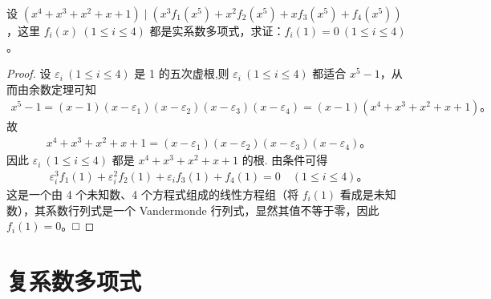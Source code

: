 \documentclass[lang=cn,newtx,10pt,scheme=chinese]{elegantbook}
\begin{document}
\begin{example}
设 $(x^4 + x^3 + x^2 + x + 1) \mid (x^3 f_1(x^5) + x^2 f_2(x^5) + x f_3(x^5) + f_4(x^5))$，这里 $f_i(x) \ (1 \leq i \leq 4)$ 都是实系数多项式，求证：$f_i(1) = 0 \ (1 \leq i \leq 4)$。
\end{example}
\begin{proof}
设 $\varepsilon_i \ (1 \leq i \leq 4)$ 是 1 的五次虚根,则 $\varepsilon_i \ (1 \leq i \leq 4)$ 都适合 $x^5 - 1$，从而由余数定理可知
\begin{align*}
x^5 - 1 = (x - 1)(x - \varepsilon_1)(x - \varepsilon_2)(x - \varepsilon_3)(x - \varepsilon_4) = (x - 1)(x^4 + x^3 + x^2 + x + 1)。
\end{align*}
故
\begin{align*}
x^4 + x^3 + x^2 + x + 1 = (x - \varepsilon_1)(x - \varepsilon_2)(x - \varepsilon_3)(x - \varepsilon_4)。
\end{align*}
因此 $\varepsilon_i \ (1 \leq i \leq 4)$ 都是 $x^4 + x^3 + x^2 + x + 1$ 的根.
由条件可得
\begin{align*}
\varepsilon_i^3 f_1(1) + \varepsilon_i^2 f_2(1) + \varepsilon_i f_3(1) + f_4(1) = 0 \quad (1 \leq i \leq 4)。
\end{align*}
这是一个由 4 个未知数、4 个方程式组成的线性方程组（将 $f_i(1)$ 看成是未知数），其系数行列式是一个 Vandermonde 行列式，显然其值不等于零，因此 $f_i(1) = 0$。□
\end{proof}

\section{复系数多项式}
\end{document}
